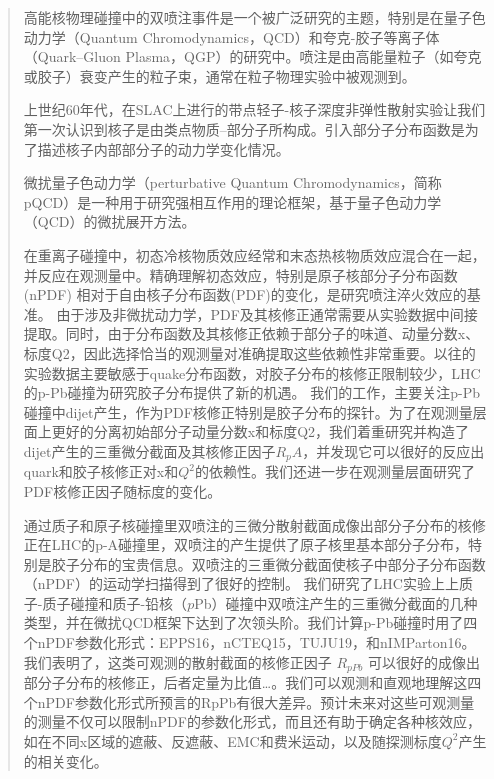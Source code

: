 
\begin{abstract}
  
  高能核物理碰撞中的双喷注事件是一个被广泛研究的主题，特别是在量子色动力学（Quantum Chromodynamics，QCD）和夸克-胶子等离子体（Quark–Gluon Plasma，QGP）的研究中。喷注是由高能量粒子（如夸克或胶子）衰变产生的粒子束，通常在粒子物理实验中被观测到。
  
  上世纪60年代，在SLAC上进行的带点轻子-核子深度非弹性散射实验让我们第一次认识到核子是由类点物质--部分子所构成。引入部分子分布函数是为了描述核子内部部分子的动力学变化情况。

  微扰量子色动力学（perturbative Quantum Chromodynamics，简称pQCD）是一种用于研究强相互作用的理论框架，基于量子色动力学（QCD）的微扰展开方法。
  
  


  在重离子碰撞中，初态冷核物质效应经常和末态热核物质效应混合在一起，并反应在观测量中。精确理解初态效应，特别是原子核部分子分布函数(nPDF) 相对于自由核子分布函数(PDF)的变化，是研究喷注淬火效应的基准。
  由于涉及非微扰动力学，PDF及其核修正通常需要从实验数据中间接提取。同时，由于分布函数及其核修正依赖于部分子的味道、动量分数x、标度Q2，因此选择恰当的观测量对准确提取这些依赖性非常重要。以往的实验数据主要敏感于quake分布函数，对胶子分布的核修正限制较少，LHC的p-Pb碰撞为研究胶子分布提供了新的机遇。
  我们的工作，主要关注p-Pb碰撞中dijet产生，作为PDF核修正特别是胶子分布的探针。为了在观测量层面上更好的分离初始部分子动量分数x和标度Q2，我们着重研究并构造了dijet产生的三重微分截面及其核修正因子$R_pA$，并发现它可以很好的反应出quark和胶子核修正对x和$Q^2$的依赖性。我们还进一步在观测量层面研究了PDF核修正因子随标度的变化。

  通过质子和原子核碰撞里双喷注的三微分散射截面成像出部分子分布的核修正在LHC的p-A碰撞里，双喷注的产生提供了原子核里基本部分子分布，特别是胶子分布的宝贵信息。双喷注的三重微分截面使核子中部分子分布函数（nPDF）的运动学扫描得到了很好的控制。
  我们研究了LHC实验上上质子-质子碰撞和质子-铅核（$p$Pb）碰撞中双喷注产生的三重微分截面的几种类型，并在微扰QCD框架下达到了次领头阶。我们计算p-Pb碰撞时用了四个nPDF参数化形式：EPPS16，nCTEQ15，TUJU19，和nIMParton16。
  我们表明了，这类可观测的散射截面的核修正因子 $R_{pPb}$ 可以很好的成像出部分子分布的核修正，后者定量为比值…。我们可以观测和直观地理解这四个nPDF参数化形式所预言的RpPb有很大差异。预计未来对这些可观测量的测量不仅可以限制nPDF的参数化形式，而且还有助于确定各种核效应，如在不同x区域的遮蔽、反遮蔽、EMC和费米运动，以及随探测标度$Q^2$产生的相关变化。


\end{abstract}

